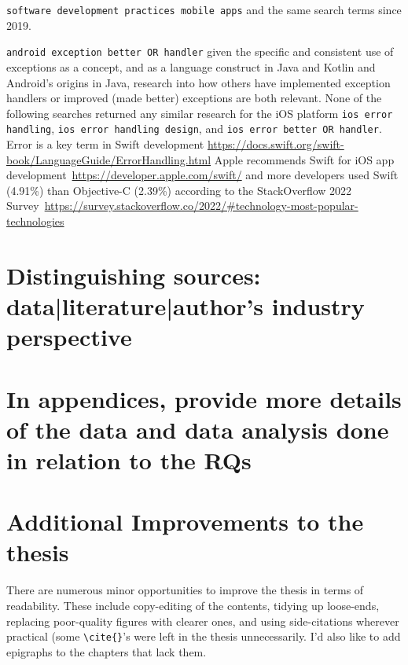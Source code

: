 
\verb|software development practices mobile apps| and the same search terms since 2019.

\verb|android exception better OR handler| given the specific and consistent use of exceptions as a concept, and as a language construct in Java and Kotlin and Android's origins in Java, research into how others have implemented exception handlers or improved (made better) exceptions are both relevant. None of the following searches returned any similar research for the iOS platform \verb|ios error handling|, \verb|ios error handling design|, and \verb|ios error better OR handler|. Error is a key term in Swift development \url{https://docs.swift.org/swift-book/LanguageGuide/ErrorHandling.html} Apple recommends Swift for iOS app development~\url{https://developer.apple.com/swift/} and more developers used Swift (4.91\%) than Objective-C (2.39\%) according to the StackOverflow 2022 Survey~\url{https://survey.stackoverflow.co/2022/\#technology-most-popular-technologies} 




\section{Distinguishing sources: data|literature|author's industry perspective}


\section{In appendices, provide more details of the data and data analysis done in relation to the RQs}


\section{Additional Improvements to the thesis}
There are numerous minor opportunities to improve the thesis in terms of readability. These include copy-editing of the contents, tidying up loose-ends, replacing poor-quality figures with clearer ones, and using side-citations wherever practical (some \verb+\cite{}+'s were left in the thesis unnecessarily. I'd also like to add epigraphs to the chapters that lack them.

